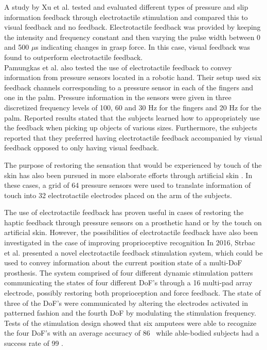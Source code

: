 A study by Xu et al. \cite{Xu2016} tested and evaluated different types of pressure and slip information feedback through electrotactile stimulation and compared this to visual feedback and no feedback. Electrotactile feedback was provided by keeping the intensity and frequency constant and then varying the pulse width between 0 and 500 $\mu $s indicating changes in grasp force. In this case, visual feedback was found to outperform electrotactile feedback. \cite{Xu2016} \\
Pamungkas et al. \cite{Pamungkas2015} also tested the use of electrotactile feedback to convey information from pressure sensors located in a robotic hand. Their setup used six feedback channels corresponding to a pressure sensor in each of the fingers and one in the palm. Pressure information in the sensors were given in three discretized frequency levels of 100, 60 and 30 Hz for the fingers and 20 Hz for the palm. Reported results stated that the subjects learned how to appropriately use the feedback when picking up objects of various sizes. Furthermore, the subjects reported that they preferred having electrotactile feedback accompanied by visual feedback opposed to only having visual feedback. \cite{Pamungkas2015} 

The purpose of restoring the sensation that would be experienced by touch of the skin has also been pursued in more elaborate efforts through artificial skin \cite{Hartmann2014,Franceschi2015}. In these cases, a grid of 64 pressure sensors were used to translate information of touch into 32 electrotactile electrodes placed on the arm of the subjects. 

The use of electrotactile feedback has proven useful in cases of restoring the haptic feedback through pressure sensors on a prosthetic hand or by the touch on artificial skin. However, the possibilities of electrotactile feedback have also been investigated in the case of improving proprioceptive recognition In 2016, Strbac et al. \cite{Strbac2016} presented a novel electrotactile feedback stimulation system, which could be used to convey information about the current position state of a multi-DoF prosthesis. The system comprised of four different dynamic stimulation patters communicating the states of four different DoF's through a 16 multi-pad array electrode, possibly restoring both proprioception and force feedback. The state of three of the DoF's were communicated by altering the electrodes activated in patterned fashion and the fourth DoF by modulating the stimulation frequency. Tests of the stimulation design showed that six amputees were able to recognize the four DoF's with an average accuracy of 86 \percent~while able-bodied subjects had a success rate of 99 \percent. \cite{Strbac2016}   

